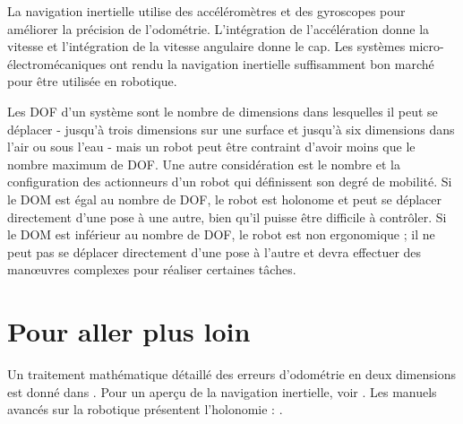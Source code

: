 La navigation inertielle utilise des accéléromètres et des gyroscopes pour améliorer la précision de l'odométrie. L'intégration de l'accélération donne la vitesse et l'intégration de la vitesse angulaire donne le cap. Les systèmes micro-électromécaniques ont rendu la navigation inertielle suffisamment bon marché pour être utilisée en robotique.

Les DOF d'un système sont le nombre de dimensions dans lesquelles il peut se déplacer - jusqu'à trois dimensions sur une surface et jusqu'à six dimensions dans l'air ou sous l'eau - mais un robot peut être contraint d'avoir moins que le nombre maximum de DOF. Une autre considération est le nombre et la configuration des actionneurs d'un robot qui définissent son degré de mobilité. Si le DOM est égal au nombre de DOF, le robot est holonome et peut se déplacer directement d'une pose à une autre, bien qu'il puisse être difficile à contrôler. Si le DOM est inférieur au nombre de DOF, le robot est non ergonomique ; il ne peut pas se déplacer directement d'une pose à l'autre et devra effectuer des manœuvres complexes pour réaliser certaines tâches.

\section{Pour aller plus loin}

Un traitement mathématique détaillé des erreurs d'odométrie en deux dimensions est donné dans \cite[Sect.~5.24]{siegwart}. Pour un aperçu de la navigation inertielle, voir \cite{king,oxford}. Les manuels avancés sur la robotique présentent l'holonomie : \cite{correll,craig,siegwart,spong}.
